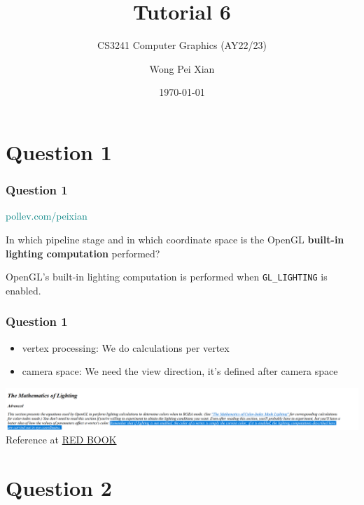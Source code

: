 \documentclass{beamer}
\title{Tutorial 6}
\subtitle{CS3241 Computer Graphics (AY22/23)}
\date{\today}
\author{Wong Pei Xian}
\institute[]{\email{e0389023@u.nus.edu}}
\begin{document}
\frame[plain]{\titlepage}

\section{Question 1}

\begin{frame}
    \frametitle{Question 1}

    \begin{tcolorbox}[colback=teal!5!white]
        \textcolor{teal}{pollev.com/peixian}
    \end{tcolorbox}

    \vspace*{1em}

    In which pipeline stage and in which coordinate space is the OpenGL 
    \textbf{built-in lighting computation} performed? 

    \begin{tcolorbox}
        OpenGL's built-in lighting computation is performed when
        \texttt{GL\_LIGHTING} is enabled.
    \end{tcolorbox}
\end{frame}

\begin{frame}
    \frametitle{Question 1}

    \begin{itemize}
        \item vertex processing: We do calculations per vertex 
        \item camera space: We need the view direction, it's defined after camera space
    \end{itemize}
    
    \begin{center}
        \includegraphics[scale=0.3]{q1.png}
        \small
        Reference at \hyperlink{https://www.glprogramming.com/red/chapter05.html}{RED BOOK}
    \end{center}

\end{frame}

\section{Question 2}
\end{document}
